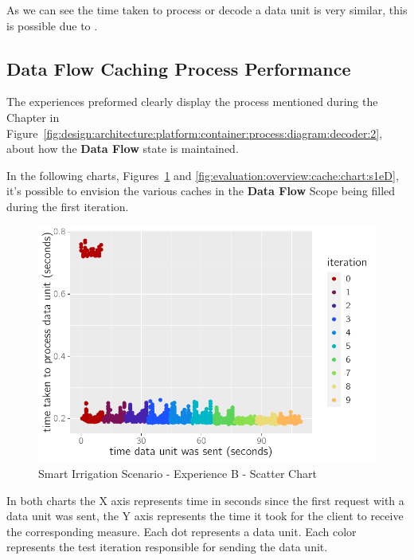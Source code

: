 As we can see the time taken to process or decode a data unit is very similar, this is possible due to .

\subsection{Data Flow Caching Process Performance}
\label{subsubsec:evaluation:overview:cache}

The experiences preformed clearly display the process mentioned during the  Chapter in Figure~\ref{fig:design:architecture:platform:container:process:diagram:decoder:2}, about how the \textbf{Data Flow} state is maintained.

In the following charts, Figures~\ref{fig:evaluation:overview:cache:chart:s2eB} and \ref{fig:evaluation:overview:cache:chart:s1eD}, it's possible to envision the various caches in the \textbf{Data Flow} Scope being filled during the first iteration.

\begin{figure}[H]
    \centering
    \includegraphics[page=1]{assets/charts/s2eB.pdf}
    \caption[Smart Irrigation Scenario - Experience B - Scatter Chart]{Smart Irrigation Scenario - Experience B - Scatter Chart}
    \label{fig:evaluation:overview:cache:chart:s2eB}
 \end{figure}

 In both charts the X axis represents time in seconds since the first request with a data unit was sent, the Y axis represents the time it took for the client to receive the corresponding measure. Each dot represents a data unit.
 Each color represents the test iteration responsible for sending the data unit.
 
